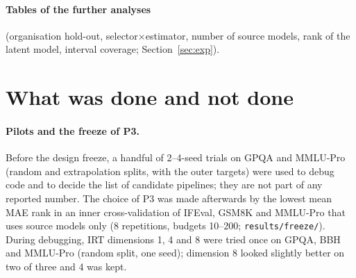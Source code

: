\paragraph{Tables of the further analyses} (organisation hold-out, selector$\times$estimator, number of source models, rank of the latent model, interval coverage; Section~\ref{sec:exp}).
\begin{table}[h]
\caption{Macro MAE (points) at $n{=}50$ on the four Open LLM Leaderboard benchmarks, 20 repetitions, for three kinds of split.}
\label{tab:family}\centering
\end{table}
\begin{table}[h]
\caption{Macro MAE (points) of selector $\times$ estimator at $n{=}50$, 7 benchmarks, 20 repetitions. B1 is random + mean. Dashes: combination not run.}
\label{tab:factorial}\centering
\end{table}
\begin{table}[h]
\caption{Macro MAE (points) at $n{=}50$ with 10, 20, 40 or all source models (7 benchmarks, 20 repetitions).}
\label{tab:ssize}\centering
\end{table}
\begin{table}[h]
\caption{Macro MAE (points) at $n{=}50$ of the stratified design with a low-rank model of rank $k$ (5 benchmarks, 20 repetitions; $k{=}8$ is the frozen P3).}
\label{tab:rank}\centering
\end{table}
\begin{table}[h]
\caption{Pooled coverage of the nominal 95\% analytic interval of single-model predictions (7 benchmarks, 20 repetitions).}
\label{tab:coverage}\centering
\end{table}

\section{What was done and not done}
\label{app:honest}

\paragraph{Pilots and the freeze of P3.}
Before the design freeze, a handful of 2--4-seed trials on GPQA and MMLU-Pro (random and extrapolation splits, with the outer targets) were used to debug code and to decide the list of candidate pipelines; they are not part of any reported number. The choice of P3 was made afterwards by the lowest mean MAE rank in an inner cross-validation of IFEval, GSM8K and MMLU-Pro that uses source models only (8 repetitions, budgets 10--200; \texttt{results/freeze/}). During debugging, IRT dimensions 1, 4 and 8 were tried once on GPQA, BBH and MMLU-Pro (random split, one seed); dimension 8 looked slightly better on two of three and 4 was kept.

